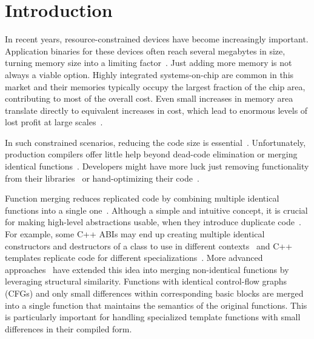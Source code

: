 \section{Introduction}
\label{sec:introduction}

In recent years, resource-constrained devices have become increasingly
important. Application binaries for these devices often reach several megabytes
in size, turning memory size into a limiting factor~\cite{plaza18}. Just adding more
memory is not always a viable option. Highly integrated systems-on-chip are
common in this market and their memories typically occupy the largest fraction
of the chip area, contributing to most of the overall cost. Even small
increases in memory area translate directly to equivalent increases in cost,
which lead to enormous levels of lost profit at large scales~\cite{edler10}.

In such constrained scenarios, reducing the code size is essential~\cite{schultz03,varma04,sehgal12,keoh14,auler17}.
Unfortunately, production compilers offer little help beyond dead-code
elimination or merging identical functions~\cite{tallam10,kwan12,livska14}.
Developers might have more luck just removing functionality from their
libraries~\cite{keoh14} or hand-optimizing their code~\cite{weaver09}.


Function merging reduces replicated code by combining multiple identical
functions into a single one~\cite{llvm-fm,livska14}. 
Although a simple and intuitive concept, it is crucial for making high-level
abstractions usable, when they introduce duplicate code~\cite{tallam10,kwan12}.
For example, some C++ ABIs may end up creating multiple identical constructors
and destructors of a class to use in different contexts~\cite{kwan12} and C++
templates replicate code for different specializations~\cite{tallam10,livska14}.
More advanced approaches~\cite{edler14} have extended this idea into
merging non-identical functions by leveraging structural similarity. Functions
with identical control-flow graphs (CFGs) and only small differences within
corresponding basic blocks are merged into a single function that maintains
the semantics of the original functions. This is particularly important for
handling specialized template functions with small differences in their
compiled form.


